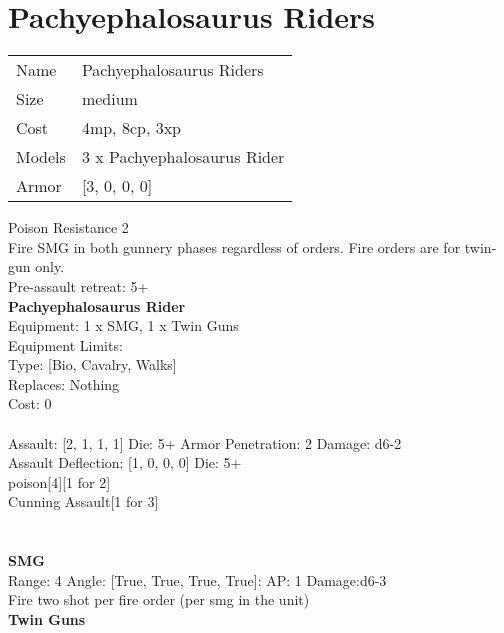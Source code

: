\pagebreak\pagebreak

\section{ Pachyephalosaurus Riders }

\begin{tabular}{ll}
  Name & Pachyephalosaurus Riders \\
  Size & medium\\
  Cost & 4mp, 8cp, 3xp\\
  Models & 3 x Pachyephalosaurus Rider\\
  Armor & [3, 0, 0, 0]\\
\end{tabular}

\noindent Poison Resistance 2\\ 
Fire SMG in both gunnery phases regardless of orders. Fire orders are for twin-gun only.\\ 
Pre-assault retreat: 5+\\ 


{\bf Pachyephalosaurus Rider } \\
Equipment: 1 x SMG, 1 x Twin Guns \\
Equipment Limits:  \\
Type: [Bio, Cavalry, Walks] \\
Replaces: Nothing \\
Cost: 0\\
\ \\
Assault: [2, 1, 1, 1] Die: 5+ Armor Penetration: 2 Damage: d6-2 \\
Assault Deflection: [1, 0, 0, 0] Die: 5+\\
\indent poison[4][1 for 2]\\ 
Cunning Assault[1 for 3]\\ 
 
\ \\

\ \\
{\bf SMG } \\



Range: 4  Angle: [True, True, True, True]: AP: 1 Damage:d6-3 \\
Fire two shot per fire order (per smg in the unit)\\ 




{\bf Twin Guns } \\



